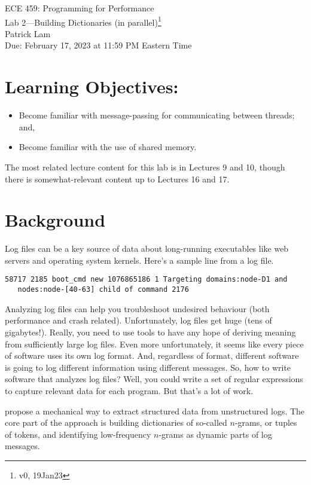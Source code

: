 \documentclass[12pt]{article}
\renewcommand{\_}{\kern-1.5pt\textunderscore\kern-1.5pt}
\begin{document}
\begin{center}
{\Large ECE 459: Programming for Performance}\\
{\Large Lab 2---Building Dictionaries (in parallel)\footnote{v0, 19Jan23}}\\[1em]
Patrick Lam\\
Due: February 17, 2023 at 11:59 PM Eastern Time
\end{center}

\section*{Learning Objectives:}

\begin{itemize}[noitemsep]
	\item Become familiar with message-passing for communicating between threads; and,
	\item Become familiar with the use of shared memory.
\end{itemize}

The most related lecture content for this lab is in Lectures 9 and 10, though there is somewhat-relevant content up to Lectures 16 and 17. 

\section*{Background}
Log files can be a key source of data about long-running executables like web servers and operating system kernels. Here's a sample line from a log file.

\begin{verbatim}
58717 2185 boot_cmd new 1076865186 1 Targeting domains:node-D1 and
   nodes:node-[40-63] child of command 2176
\end{verbatim}

Analyzing log files can help you troubleshoot undesired behaviour (both performance and crash related). Unfortunately, log files get huge (tens of gigabytes!). Really, you need to use tools to have any hope of deriving meaning from sufficiently large log files. Even more unfortunately, it seems like every piece of software uses its own log format. And, regardless of format, different software is going to log different information using different messages. So, how to write software that analyzes log files? Well, you could write a set of regular expressions to capture relevant data for each program. But that's a lot of work.

\cite{dai22} propose a mechanical way to extract structured data from unstructured logs. The core part of the approach is building dictionaries of so-called $n$-grams, or tuples of tokens, and identifying low-frequency $n$-grams as dynamic parts of log messages.
\end{document}
